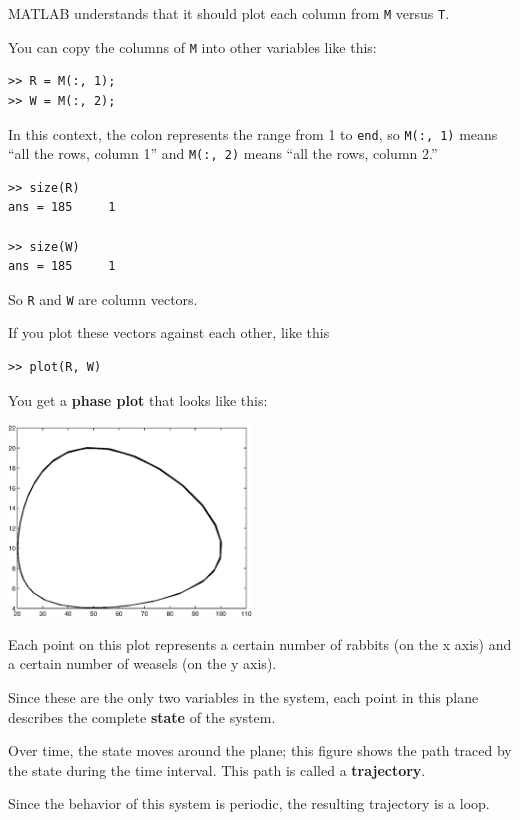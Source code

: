 \documentclass[
]{book}
\begin{document}
MATLAB understands that it should plot each column from {\tt M}
versus {\tt T}.

You can copy the columns of {\tt M} into other variables like
this:

\begin{verbatim}
>> R = M(:, 1);
>> W = M(:, 2);
\end{verbatim}

In this context, the colon represents the range from 1 to {\tt end},
so {\tt M(:, 1)} means ``all the rows, column 1'' and
{\tt M(:, 2)} means ``all the rows, column 2.''

\begin{verbatim}
>> size(R)
ans = 185     1

>> size(W)
ans = 185     1
\end{verbatim}

So {\tt R} and {\tt W} are column vectors.

If you plot these
vectors against each other, like this

\begin{verbatim}
>> plot(R, W)
\end{verbatim}

You get a {\bf phase plot} that looks like this:

\beforefig \centerline{\includegraphics[height=2in]{figs/phase.eps}}

Each point on this plot represents a certain number of rabbits (on the
x axis) and a certain number of weasels (on the y axis).

Since these are the only two variables in the system, each point in
this plane describes the complete {\bf state} of the system.

Over time, the state moves around the plane; this figure shows
the path traced by the state during the time interval.  This path
is called a {\bf trajectory}.

Since the behavior of this system is periodic, the resulting
trajectory is a loop.
\end{document}
